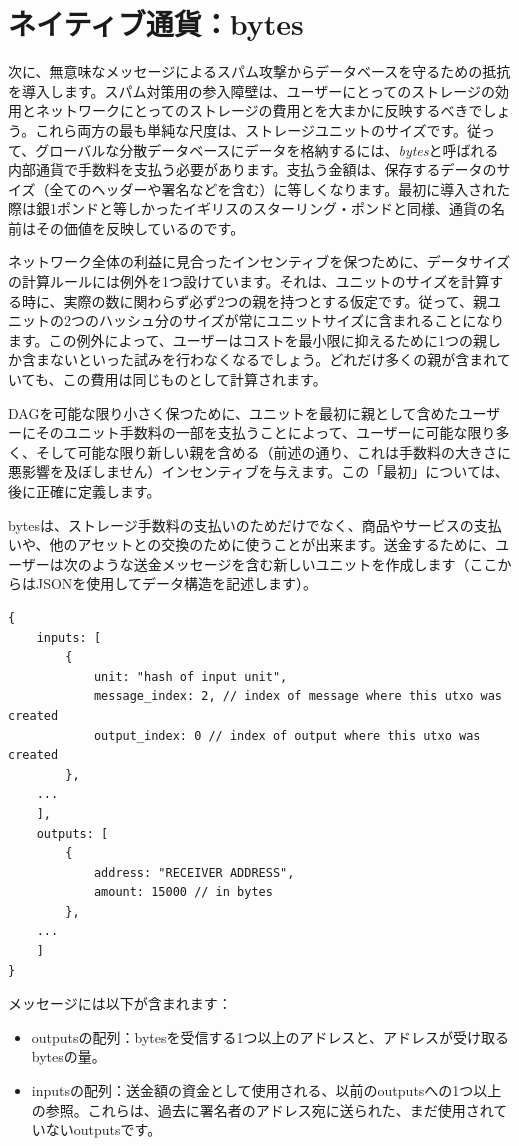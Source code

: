 \documentclass[a4paper, dvipdfmx]{jsarticle}
\begin{document}
\section{ネイティブ通貨：bytes}
次に、無意味なメッセージによるスパム攻撃からデータベースを守るための抵抗を導入します。スパム対策用の参入障壁は、ユーザーにとってのストレージの効用とネットワークにとってのストレージの費用とを大まかに反映するべきでしょう。これら両方の最も単純な尺度は、ストレージユニットのサイズです。従って、グローバルな分散データベースにデータを格納するには、\emph{bytes}と呼ばれる内部通貨で手数料を支払う必要があります。支払う金額は、保存するデータのサイズ（全てのヘッダーや署名などを含む）に等しくなります。最初に導入された際は銀1ポンドと等しかったイギリスのスターリング・ポンドと同様、通貨の名前はその価値を反映しているのです。

ネットワーク全体の利益に見合ったインセンティブを保つために、データサイズの計算ルールには例外を1つ設けています。それは、ユニットのサイズを計算する時に、実際の数に関わらず必ず2つの親を持つとする仮定です。従って、親ユニットの2つのハッシュ分のサイズが常にユニットサイズに含まれることになります。この例外によって、ユーザーはコストを最小限に抑えるために1つの親しか含まないといった試みを行わなくなるでしょう。どれだけ多くの親が含まれていても、この費用は同じものとして計算されます。

DAGを可能な限り小さく保つために、ユニットを最初に親として含めたユーザーにそのユニット手数料の一部を支払うことによって、ユーザーに可能な限り多く、そして可能な限り新しい親を含める（前述の通り、これは手数料の大きさに悪影響を及ぼしません）インセンティブを与えます。この「最初」については、後に正確に定義します。

bytesは、ストレージ手数料の支払いのためだけでなく、商品やサービスの支払いや、他のアセットとの交換のために使うことが出来ます。送金するために、ユーザーは次のような送金メッセージを含む新しいユニットを作成します（ここからはJSONを使用してデータ構造を記述します）。

\begin{lstlisting}[basicstyle=\ttfamily\footnotesize, frame=none]
{
    inputs: [
        {
            unit: "hash of input unit",
            message_index: 2, // index of message where this utxo was created
            output_index: 0 // index of output where this utxo was created
        },
    ...
    ],
    outputs: [
        {
            address: "RECEIVER ADDRESS",
            amount: 15000 // in bytes
        },
    ...
    ]
}
\end{lstlisting}

\noindent メッセージには以下が含まれます：
\begin{itemize}
    \item outputsの配列：bytesを受信する1つ以上のアドレスと、アドレスが受け取るbytesの量。
    \item inputsの配列：送金額の資金として使用される、以前のoutputsへの1つ以上の参照。これらは、過去に署名者のアドレス宛に送られた、まだ使用されていないoutputsです。
\end{itemize}
\end{document}
